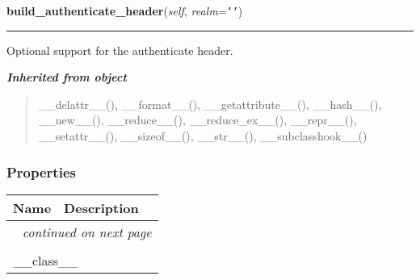     \label{lib:oauth:OAuthServer:build_authenticate_header}

    \vspace{0.5ex}

\hspace{.8\funcindent}\begin{boxedminipage}{\funcwidth}

    \raggedright \textbf{build\_authenticate\_header}(\textit{self}, \textit{realm}={\tt \texttt{'}\texttt{}\texttt{'}})

    \vspace{-1.5ex}

    \rule{\textwidth}{0.5\fboxrule}
\setlength{\parskip}{2ex}
    Optional support for the authenticate header.

\setlength{\parskip}{1ex}
    \end{boxedminipage}


\large{\textbf{\textit{Inherited from object}}}

\begin{quote}
\_\_delattr\_\_(), \_\_format\_\_(), \_\_getattribute\_\_(), \_\_hash\_\_(), \_\_new\_\_(), \_\_reduce\_\_(), \_\_reduce\_ex\_\_(), \_\_repr\_\_(), \_\_setattr\_\_(), \_\_sizeof\_\_(), \_\_str\_\_(), \_\_subclasshook\_\_()
\end{quote}


  \subsubsection{Properties}

    \vspace{-1cm}
\hspace{\varindent}\begin{longtable}{|p{\varnamewidth}|p{\vardescrwidth}|l}
\cline{1-2}
\cline{1-2} \centering \textbf{Name} & \centering \textbf{Description}& \\
\cline{1-2}
\endhead\cline{1-2}\multicolumn{3}{r}{\small\textit{continued on next page}}\\\endfoot\cline{1-2}
\endlastfoot\multicolumn{2}{|l|}{\textit{Inherited from object}}\\
\multicolumn{2}{|p{\varwidth}|}{\raggedright \_\_class\_\_}\\
\cline{1-2}
\end{longtable}


